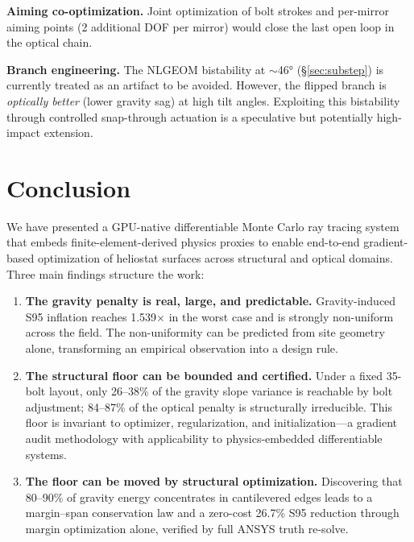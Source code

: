 \documentclass{CVM}
\begin{document}
\textbf{Aiming co-optimization.} Joint optimization of bolt strokes and
per-mirror aiming points (2 additional DOF per mirror) would close the last
open loop in the optical chain.

\textbf{Branch engineering.} The NLGEOM bistability at $\sim$46\si{\degree}
(\S\ref{sec:substep}) is currently treated as an artifact to be avoided.
However, the flipped branch is \emph{optically better} (lower gravity sag) at
high tilt angles. Exploiting this bistability through controlled snap-through
actuation is a speculative but potentially high-impact extension.

\section{Conclusion}

We have presented a GPU-native differentiable Monte Carlo ray tracing system
that embeds finite-element-derived physics proxies to enable end-to-end
gradient-based optimization of heliostat surfaces across structural and optical
domains. Three main findings structure the work:

\begin{enumerate}
  \item \textbf{The gravity penalty is real, large, and predictable.}
  Gravity-induced S95 inflation reaches 1.539$\times$ in the worst case and
  is strongly non-uniform across the field. The non-uniformity can be
  predicted from site geometry alone, transforming an empirical observation
  into a design rule.

  \item \textbf{The structural floor can be bounded and certified.} Under a
  fixed 35-bolt layout, only 26--38\% of the gravity slope variance is
  reachable by bolt adjustment; 84--87\% of the optical penalty is
  structurally irreducible. This floor is invariant to optimizer,
  regularization, and initialization---a gradient audit methodology with
  applicability to physics-embedded differentiable systems.

  \item \textbf{The floor can be moved by structural optimization.}
  Discovering that 80--90\% of gravity energy concentrates in cantilevered
  edges leads to a margin--span conservation law and a zero-cost 26.7\%
  S95 reduction through margin optimization alone, verified by full ANSYS
  truth re-solve.
\end{enumerate}
\end{document}
